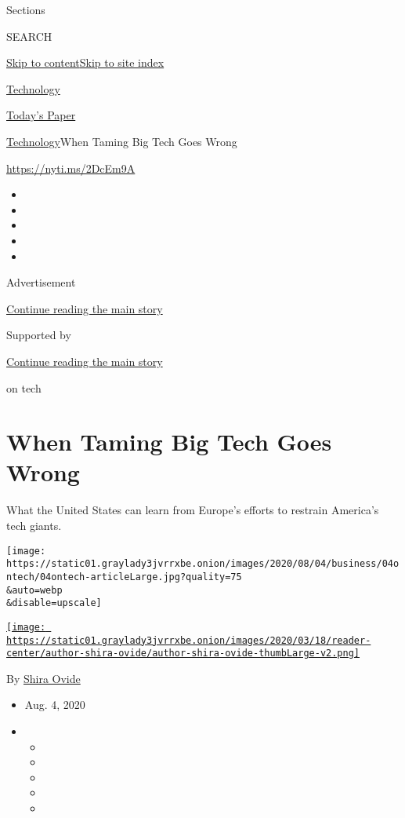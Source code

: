 Sections

SEARCH

\protect\hyperlink{site-content}{Skip to
content}\protect\hyperlink{site-index}{Skip to site index}

\href{https://www.nytimes3xbfgragh.onion/section/technology}{Technology}

\href{https://myaccount.nytimes3xbfgragh.onion/auth/login?response_type=cookie\&client_id=vi}{}

\href{https://www.nytimes3xbfgragh.onion/section/todayspaper}{Today's
Paper}

\href{/section/technology}{Technology}\textbar{}When Taming Big Tech
Goes Wrong

\href{https://nyti.ms/2DcEm9A}{https://nyti.ms/2DcEm9A}

\begin{itemize}
\item
\item
\item
\item
\item
\end{itemize}

Advertisement

\protect\hyperlink{after-top}{Continue reading the main story}

Supported by

\protect\hyperlink{after-sponsor}{Continue reading the main story}

on tech

\hypertarget{when-taming-big-tech-goes-wrong}{%
\section{When Taming Big Tech Goes
Wrong}\label{when-taming-big-tech-goes-wrong}}

What the United States can learn from Europe's efforts to restrain
America's tech giants.

\texttt{[image: https://static01.graylady3jvrrxbe.onion/images/2020/08/04/business/04ontech/04ontech-articleLarge.jpg?quality=75\\\&auto=webp\\\&disable=upscale]}

\href{https://www.nytimes3xbfgragh.onion/by/shira-ovide}{\texttt{[image: https://static01.graylady3jvrrxbe.onion/images/2020/03/18/reader-center/author-shira-ovide/author-shira-ovide-thumbLarge-v2.png]}}

By \href{https://www.nytimes3xbfgragh.onion/by/shira-ovide}{Shira Ovide}

\begin{itemize}
\item
  Aug. 4, 2020
\item
  \begin{itemize}
  \item
  \item
  \item
  \item
  \item
  \end{itemize}
\end{itemize}

